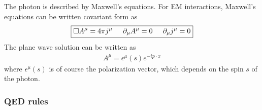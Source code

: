 \documentclass{book}
\theoremstyle{definition}
\newcommand{\p}{\partial}
\begin{document}
The photon is described by Maxwell's equations. For EM interactions, Maxwell's equations can be written covariant form as
\begin{align}
\boxed{\square A^\mu = 4\pi j^\mu \hspace{0.5cm} \p_\mu A^\mu = 0 \hspace{0.5cm} \p_\mu j^\mu = 0}
\end{align}
The plane wave solution can be written as
\begin{align}
A^\mu = \epsilon^\mu(s) e^{-ip\cdot x} 
\end{align}
where $\epsilon^\mu(s)$ is of course the polarization vector, which depends on the spin $s$ of the photon. 







































\subsubsection{QED rules}
\end{document}
